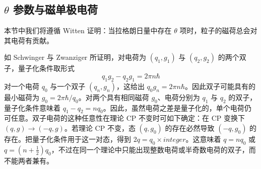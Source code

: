 \subsection{$\theta$ 参数与磁单极电荷}

本节中我们将遵循 Witten \cite{Witten79} 证明：当拉格朗日量中存在 $\theta$ 项时，粒子的磁荷总会对其电荷有贡献。

如 Schwinger 与 Zwanziger 所证明，对电荷为 $(q_1,g_1)$ 与 $(q_2,g_2)$ 的两个双子，量子化条件取形式
\begin{equation}
q_1g_2 - q_2g_1 = 2 \pi n \hbar
\label{LXXVI}
\end{equation}
对一个电荷 $q_0$ 与一个双子 $(q_n,g_n)$，这给出 $q_0g_n = 2\pi n\hbar$。因此双子可能具有的最小磁荷为 $g_0=2\pi\hbar/q_0$。对两个具有相同磁荷 $g_0$、电荷分别为 $q_1$ 与 $q_2$ 的双子，量子化条件意味着 $q_1-q_2= nq_0$。因此，虽然电荷之差是量子化的，单个电荷仍可任意。双子电荷的这种任意性在理论 CP 不变时可如下确定：在 CP 变换下 $(q,g)\rightarrow (-q,g)$。若理论 CP 不变，态 $(q,g_0)$ 的存在必然导致 $(-q,g_0)$ 的存在。把量子化条件用于这一对态，得到 $2q =q_0\times integer$。这意味着 $q=nq_0$ 或 $q=(n+\frac{1}{2})q_0$，不过在同一个理论中只能出现整数电荷或半奇数电荷的双子，而不能两者兼有。

